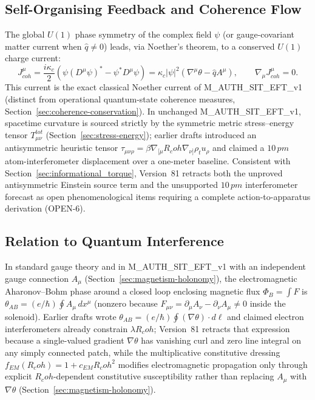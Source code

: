 \documentclass[american,11pt,letterpaper]{article}
\newcommand{\Rcoh}{R_{\mathrm{coh}}}
\def\mathrm#1{#1}%
\def\texttt#1{#1}%
\def\Rcoh{R_coh}%
\begin{document}
\subsection{Self-Organising Feedback and Coherence Flow}

The global $U(1)$ phase symmetry of the complex field $\psi$ (or gauge-covariant matter current when $\hat{q} \neq 0$) leads, via Noether's theorem, to a conserved $U(1)$ charge current:
\[
    J^\mu_{\mathrm{coh}} = \frac{i\kappa_c}{2} \left( \psi (D^\mu \psi)^* - \psi^* D^\mu \psi \right) = \kappa_c |\psi|^2 (\nabla^\mu \theta - \hat{q} A^\mu),
    \qquad
    \nabla_\mu J^\mu_{\mathrm{coh}} = 0.
\]
This current is the exact classical Noether current of \texttt{M\_AUTH\_SIT\_EFT\_v1} (distinct from operational quantum-state coherence measures, Section~\ref{sec:coherence-conservation}). In unchanged \texttt{M\_AUTH\_SIT\_EFT\_v1}, spacetime curvature is sourced strictly by the symmetric metric stress--energy tensor $T_{\mu\nu}^{\mathrm{tot}}$ (Section~\ref{sec:stress-energy}); earlier drafts introduced an antisymmetric heuristic tensor $\tau_{\mu\nu\rho} = \beta\nabla_{[\mu}\Rcoh\nabla_{\nu]}\rho_t u_\rho$ and claimed a $10\,\mathrm{pm}$ atom-interferometer displacement over a one-meter baseline. Consistent with Section~\ref{sec:informational_torque}, Version~81 retracts both the unproved antisymmetric Einstein source term and the unsupported $10\,\mathrm{pm}$ interferometer forecast as open phenomenological items requiring a complete action-to-apparatus derivation (\texttt{OPEN-6}).

\subsection{Relation to Quantum Interference}

In standard gauge theory and in \texttt{M\_AUTH\_SIT\_EFT\_v1} with an independent gauge connection $A_\mu$ (Section~\ref{sec:magnetism-holonomy}), the electromagnetic Aharonov--Bohm phase around a closed loop enclosing magnetic flux $\Phi_B = \int F$ is $\theta_{\mathrm{AB}} = (e/\hbar)\oint A_\mu\,dx^\mu$ (nonzero because $F_{\mu\nu} = \partial_\mu A_\nu - \partial_\nu A_\mu \neq 0$ inside the solenoid). Earlier drafts wrote $\theta_{\mathrm{AB}} = (e/\hbar)\oint (\nabla\theta)\cdot d\boldsymbol{\ell}$ and claimed electron interferometers already constrain $\lambda \Rcoh$; Version~81 retracts that expression because a single-valued gradient $\nabla\theta$ has vanishing curl and zero line integral on any simply connected patch, while the multiplicative constitutive dressing $f_{\mathrm{EM}}(\Rcoh) = 1 + c_{\mathrm{EM}}\Rcoh^2$ modifies electromagnetic propagation only through explicit $\Rcoh$-dependent constitutive susceptibility rather than replacing $A_\mu$ with $\nabla\theta$ (Section~\ref{sec:magnetism-holonomy}).
\end{document}
